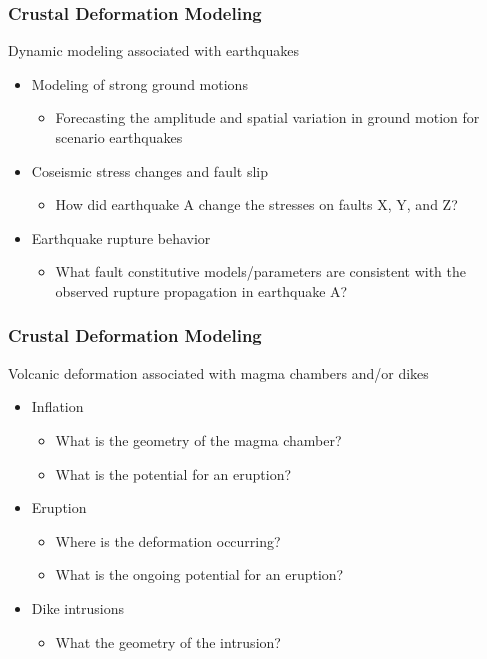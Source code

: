 \documentclass{beamer}
\begin{document}
\begin{frame}
  \frametitle{Crustal Deformation Modeling}

  \vfill
  Dynamic modeling associated with earthquakes
  \vfill

  \begin{itemize}
  \item Modeling of strong ground motions
    \begin{itemize}
    \item Forecasting the amplitude and spatial variation in ground
      motion for scenario earthquakes
    \end{itemize}
  \item Coseismic stress changes and fault slip
    \begin{itemize}
    \item How did earthquake A change the stresses on faults X, Y, and Z?
    \end{itemize}
  \item Earthquake rupture behavior
    \begin{itemize}
    \item What fault constitutive models/parameters are consistent
      with the observed rupture propagation in earthquake A?
    \end{itemize}
  \end{itemize}
  \vfill

\end{frame}


\begin{frame}
  \frametitle{Crustal Deformation Modeling}

  \vfill
  Volcanic deformation associated with magma chambers and/or dikes
  \begin{itemize}
  \item Inflation
    \begin{itemize}
    \item What is the geometry of the magma chamber?
    \item What is the potential for an eruption?
    \end{itemize}
  \item Eruption
    \begin{itemize}
    \item Where is the deformation occurring?
    \item What is the ongoing potential for an eruption?
    \end{itemize}
  \item Dike intrusions
    \begin{itemize}
    \item What the geometry of the intrusion?
    \end{itemize}
  \end{itemize}
  \vfill

\end{frame}
\end{document}

